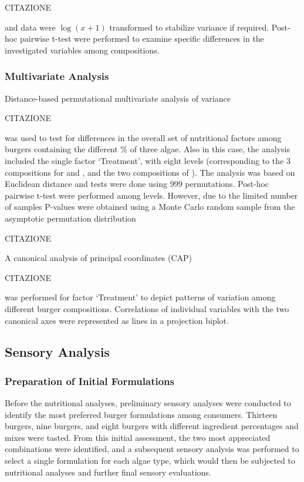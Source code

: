 CITAZIONE

and data were $ \log(x + 1) $ transformed to stabilize variance if required. Post-hoc pairwise t-test were performed to examine specific differences in the investigated variables among compositions.

\subsubsection{Multivariate Analysis}
Distance-based permutational multivariate analysis of variance 

CITAZIONE

was used to test for differences in the overall set of nutritional factors among burgers containing the different \% of three algae. Also in this case, the analysis included the single factor ‘Treatment’, with eight levels (corresponding to the 3 compositions for  and , and the two compositions of ). The analysis was based on Euclidean distance and tests were done using 999 permutations. Post-hoc pairwise t-test were performed among levels. However, due to the limited number of samples P-values were obtained using a Monte Carlo random sample from the asymptotic permutation distribution 

CITAZIONE

A canonical analysis of principal coordinates (CAP) 

CITAZIONE

was performed for factor ‘Treatment’ to depict patterns of variation among different burger compositions. Correlations of individual variables with the two canonical axes were represented as lines in a projection biplot.

\subsection{Sensory Analysis}
\subsubsection{Preparation of Initial Formulations}
Before the nutritional analyses, preliminary sensory analyses were conducted to identify the most preferred burger formulations among consumers. Thirteen  burgers, nine  burgers, and eight  burgers with different ingredient percentages and mixes were tasted. From this initial assessment, the two most appreciated combinations were identified, and a subsequent sensory analysis was performed to select a single formulation for each algae type, which would then be subjected to nutritional analyses and further final sensory evaluations.

